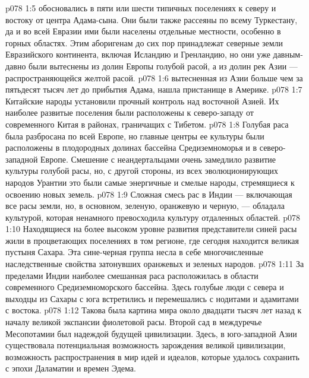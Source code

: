 \vs p078 1:5 \pc {}\bibnobreakspace {} обосновались в пяти или шести типичных поселениях к северу и востоку от центра Адама\hyp{}сына. Они были также рассеяны по всему Туркестану, да и во всей Евразии ими были населены отдельные местности, особенно в горных областях. Этим аборигенам до сих пор принадлежат северные земли Евразийского континента, включая Исландию и Гренландию, но они уже давным\hyp{}давно были вытеснены из долин Европы голубой расой, а из долин рек Азии --- распространяющейся желтой расой.
\vs p078 1:6 \pc {}\bibnobreakspace {} вытесненная из Азии больше чем за пятьдесят тысяч лет до прибытия Адама, нашла пристанище в Америке.
\vs p078 1:7 \pc {}\bibnobreakspace {} Китайские народы установили прочный контроль над восточной Азией. Их наиболее развитые поселения были расположены к северо\hyp{}западу от современного Китая в районах, граничащих с Тибетом.
\vs p078 1:8 \pc {}\bibnobreakspace {} Голубая раса была разбросана по всей Европе, но главные центры ее культуры были расположены в плодородных долинах бассейна Средиземноморья и в северо\hyp{}западной Европе. Смешение с неандертальцами очень замедлило развитие культуры голубой расы, но, с другой стороны, из всех эволюционирующих народов Урантии это были самые энергичные и смелые народы, стремящиеся к освоению новых земель.
\vs p078 1:9 \pc {}\bibnobreakspace {} Сложная смесь рас в Индии --- включающая все расы земли, но, в основном, зеленую, оранжевую и черную, --- обладала культурой, которая ненамного превосходила культуру отдаленных областей.
\vs p078 1:10 \pc {}\bibnobreakspace {} Находящиеся на более высоком уровне развития представители синей расы жили в процветающих поселениях в том регионе, где сегодня находится великая пустыня Сахара. Эта сине\hyp{}черная группа несла в себе многочисленные наследственные свойства затонувших оранжевых и зеленых народов.
\vs p078 1:11 \pc {}\bibnobreakspace {} За пределами Индии наиболее смешанная раса расположилась в области современного Средиземноморского бассейна. Здесь голубые люди с севера и выходцы из Сахары с юга встретились и перемешались с нодитами и адамитами с востока.
\vs p078 1:12 \pc Такова была картина мира около двадцати тысяч лет назад к началу великой экспансии фиолетовой расы. Второй сад в междуречье Месопотамии был надеждой будущей цивилизации. Здесь, в юго\hyp{}западной Азии существовала потенциальная возможность зарождения великой цивилизации, возможность распространения в мир идей и идеалов, которые удалось сохранить с эпохи Даламатии и времен Эдема.
